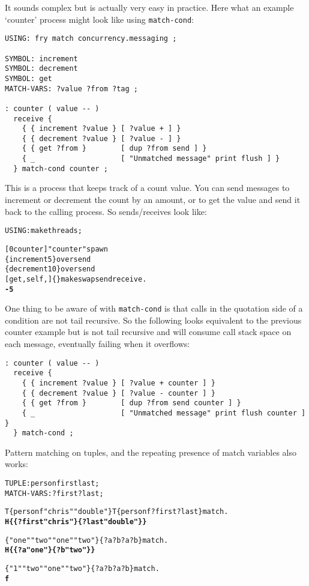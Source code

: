 
It sounds complex but is actually very easy in practice. Here what an
example `counter' process might look like using \verb|match-cond|:

\begin{verbatim}
USING: fry match concurrency.messaging ;

SYMBOL: increment
SYMBOL: decrement
SYMBOL: get
MATCH-VARS: ?value ?from ?tag ;

: counter ( value -- )
  receive {
    { { increment ?value } [ ?value + ] }
    { { decrement ?value } [ ?value - ] }
    { { get ?from }        [ dup ?from send ] }
    { _                    [ "Unmatched message" print flush ] }
  } match-cond counter ;
\end{verbatim}

This is a process that keeps track of a count value. You can send
messages to increment or decrement the count by an amount, or to get
the value and send it back to the calling process. So sends/receives
look like:

\begin{alltt}
USING: make threads ;

[ 0 counter ] "counter" spawn
\{ increment 5 \} over send
\{ decrement 10 \} over send
[ get , self , ] \{ \} make swap send receive .
  \textbf{-5}
\end{alltt}

One thing to be aware of with \verb|match-cond| is that calls in the
quotation side of a condition are not tail recursive. So the following
looks equivalent to the previous counter example but is not tail
recursive and will consume call stack space on each message,
eventually failing when it overflows:

\begin{verbatim}
: counter ( value -- )
  receive {
    { { increment ?value } [ ?value + counter ] }
    { { decrement ?value } [ ?value - counter ] }
    { { get ?from }        [ dup ?from send counter ] }
    { _                    [ "Unmatched message" print flush counter ] }
  } match-cond ;
\end{verbatim}

Pattern matching on tuples, and the repeating presence of match
variables also works:

\begin{alltt}
TUPLE: person first last ;
MATCH-VARS: ?first ?last ;

T\{ person f "chris" "double" \} T\{ person f ?first ?last \} match .
  \textbf{H\{ \{ ?first "chris" \} \{ ?last "double" \} \}}

\{ "one" "two" "one" "two" \} \{ ?a ?b ?a ?b \} match .
  \textbf{H\{ \{ ?a "one" \} \{ ?b "two" \} \}}

\{ "1" "two" "one" "two" \} \{ ?a ?b ?a ?b \} match .
  \textbf{f}
\end{alltt}
